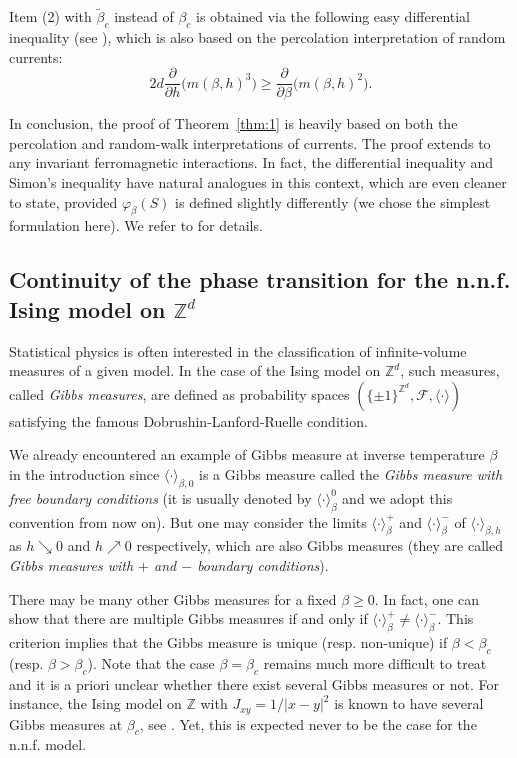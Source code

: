 \documentclass[a4paper,oneside,11pt]{article}
\newcommand{\ee}{\end{equation}}
\newcommand{\be}{\begin{equation}}
\begin{document}
Item (2) with $\tilde\beta_c$ instead of $\beta_c$ is obtained via the following easy differential inequality (see \cite[(1.12)]{AizBarFer87}), which is also based on the percolation interpretation of random currents:
\be
2d \frac{\partial}{\partial h}\big(m(\beta,h)^3\big)\ge \frac{\partial}{\partial \beta}\big(m(\beta,h)^2\big).
\ee

In conclusion, the proof of Theorem~\ref{thm:1} is heavily based on both the percolation and random-walk interpretations of currents. The proof extends to any invariant ferromagnetic interactions. In fact, the differential inequality and Simon's inequality have natural analogues in this context, which are even cleaner to state, provided $\varphi_\beta(S)$ is defined slightly differently (we chose the simplest formulation here). We refer to \cite{DumTas15} for details.

\subsection{Continuity of the phase transition for the n.n.f. Ising model on $\mathbb Z^d$}\label{sec:3}

Statistical physics is often interested in the classification of infinite-volume measures of a given model. In the case of the Ising model on $\mathbb Z^d$, such measures, called {\em Gibbs measures}, are defined as probability spaces $(\{\pm1\}^{\mathbb Z^d},\mathcal F,\langle\cdot\rangle)$ satisfying the famous Dobrushin-Lanford-Ruelle condition.

We already encountered an example of Gibbs measure at inverse temperature $\beta$ in the introduction since $\langle \cdot\rangle_{\beta,0}$ is a Gibbs measure called the {\em Gibbs measure with free boundary conditions} (it is usually denoted by $\langle\cdot\rangle_\beta^0$ and we adopt this convention from now on). But one may consider the limits $\langle\cdot\rangle_\beta^+$ and $\langle \cdot\rangle_\beta^-$ of $\langle\cdot\rangle_{\beta,h}$ as $h\searrow 0$ and $h\nearrow 0$ respectively, which are also Gibbs measures (they are called {\em Gibbs measures with $+$ and $-$ boundary conditions}). 



There may be many other Gibbs measures for a fixed $\beta\ge0$. In fact, one can show that there are multiple Gibbs measures if and only if $\langle\cdot\rangle_\beta^+\ne\langle\cdot\rangle_\beta^-$. This criterion implies that the Gibbs measure is unique (resp. non-unique) if $\beta<\beta_c$ (resp. $\beta>\beta_c$). Note that the case $\beta=\beta_c$ remains much more difficult to treat and it is a priori unclear whether there exist several Gibbs measures or not. 
For instance, the Ising model on $\mathbb Z$ with $J_{xy}=1/|x-y|^2$ is known to have several Gibbs measures at $\beta_c$, see \cite{AizChaCha88}. Yet, this is expected never to be the case for the n.n.f. model.
\end{document}

